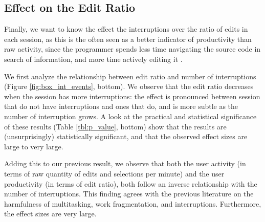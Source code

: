 \documentclass[conference]{IEEEtran}
\begin{document}
\subsection{Effect on the Edit Ratio}
Finally, we want to know the effect the interruptions over the ratio of edits in each session, as this is the often seen as a better indicator of productivity than raw activity, since the programmer spends less time navigating the source code in search of information, and more time actively editing it \cite{KM06}.

We first analyze the relationship between edit ratio and number of interruptions (Figure \ref{fig:box_int_events}, bottom). We observe that the edit ratio decreases when the session has more interruptions: the effect is pronounced between session that do not have interruptions and ones that do, and is more subtle as the number of interruption grows. A look at the practical and statistical significance of these results (Table \ref{tbl:p_value}, bottom) show that the results are (unsurprisingly) statistically significant, and that the observed effect sizes are large to very large.

Adding this to our previous result, we observe that both the user activity (in terms of raw quantity of edits and selections per minute) and the user productivity (in terms of edit ratio), both follow an inverse relationship with the number of interruptions. This finding agrees with the previous literature on the harmfulness of multitasking, work fragmentation, and interruptions. Furthermore, the effect sizes are very large.

\end{document}
